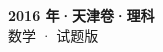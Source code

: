 \documentclass[zihao=-4, a4paper]{ctexart}
\begin{document}
\begin{center}
  {\Large\bfseries 2016 年·天津卷·理科}\\[4pt]
  {\large 数学 · 试题版}
\end{center}
\medskip
{}

\end{document}
